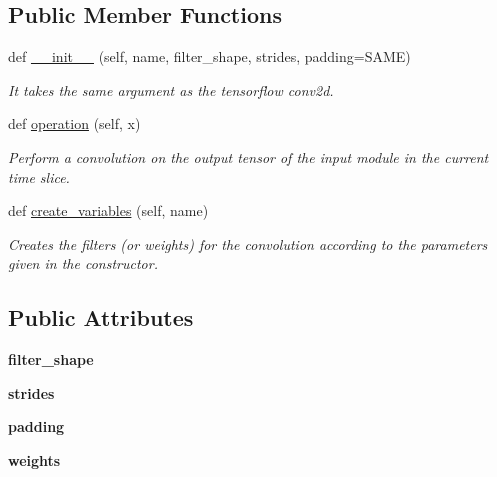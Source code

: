 \subsection*{Public Member Functions}
\begin{DoxyCompactItemize}
\item 
\mbox{\label{classmodules_1_1_conv2_d_module_a4b8ae22ca179fb5dd43308be41a6cd69}} 
def \hyperlink{classmodules_1_1_conv2_d_module_a4b8ae22ca179fb5dd43308be41a6cd69}{\+\_\+\+\_\+init\+\_\+\+\_\+} (self, name, filter\+\_\+shape, strides, padding=\textquotesingle{}S\+A\+ME\textquotesingle{})
\begin{DoxyCompactList}\small\item\em It takes the same argument as the tensorflow conv2d. \end{DoxyCompactList}\item 
def \hyperlink{classmodules_1_1_conv2_d_module_a076958c1410647dd4e7982c61c72585f}{operation} (self, x)
\begin{DoxyCompactList}\small\item\em Perform a convolution on the output tensor of the input module in the current time slice. \end{DoxyCompactList}\item 
\mbox{\label{classmodules_1_1_conv2_d_module_a03aef9494daf02037d2b2eb581e5eb42}} 
def \hyperlink{classmodules_1_1_conv2_d_module_a03aef9494daf02037d2b2eb581e5eb42}{create\+\_\+variables} (self, name)
\begin{DoxyCompactList}\small\item\em Creates the filters (or weights) for the convolution according to the parameters given in the constructor. \end{DoxyCompactList}\end{DoxyCompactItemize}
\subsection*{Public Attributes}
\begin{DoxyCompactItemize}
\item 
\mbox{\label{classmodules_1_1_conv2_d_module_a90ed6577efa095e41c0469bbe3cdc36b}} 
{\bfseries filter\+\_\+shape}
\item 
\mbox{\label{classmodules_1_1_conv2_d_module_a0f17e4adfc620cb0dbf4e66edf8b2411}} 
{\bfseries strides}
\item 
\mbox{\label{classmodules_1_1_conv2_d_module_a937db3136e264bf649567930729a3491}} 
{\bfseries padding}
\item 
\mbox{\label{classmodules_1_1_conv2_d_module_a6efceb0b6be04ded563de096808f7e0e}} 
{\bfseries weights}
\end{DoxyCompactItemize}


